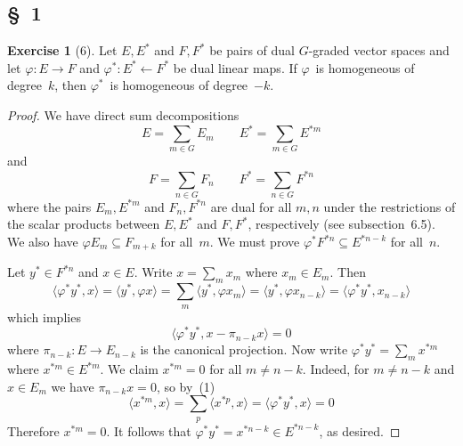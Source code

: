\documentclass[letterpaper,12pt]{article}
\newcommand{\from}{\leftarrow}
\newcommand{\sprod}[2]{\langle#1,#2\rangle}
\theoremstyle{definition}
\newtheorem*{exer}{Exercise}
\theoremstyle{remark}
\begin{document}
\subsection*{\S~1}
\begin{exer}[6]
Let \(E,E^*\) and \(F,F^*\) be pairs of dual \(G\)-graded vector spaces and let \(\varphi:E\to F\) and \(\varphi^*:E^*\from F^*\) be dual linear maps. If \(\varphi\)~is homogeneous of degree~\(k\), then \(\varphi^*\)~is homogeneous of degree~\(-k\).
\end{exer}
\begin{proof}
We have direct sum decompositions
\[E=\sum_{m\in G}E_m\qquad E^*=\sum_{m\in G}E^{*m}\]
and
\[F=\sum_{n\in G}F_n\qquad F^*=\sum_{n\in G}F^{*n}\]
where the pairs \(E_m,E^{*m}\) and \(F_n,F^{*n}\) are dual for all \(m,n\) under the restrictions of the scalar products between \(E,E^*\) and \(F,F^*\), respectively (see subsection~6.5). We also have \(\varphi E_m\subseteq F_{m+k}\) for all~\(m\). We must prove \(\varphi^* F^{*n}\subseteq E^{*n-k}\) for all~\(n\).

Let \(y^*\in F^{*n}\) and \(x\in E\). Write \(x=\sum_m x_m\) where \(x_m\in E_m\). Then
\[\sprod{\varphi^* y^*}{x}=\sprod{y^*}{\varphi x}=\sum_m\sprod{y^*}{\varphi x_m}=\sprod{y^*}{\varphi x_{n-k}}=\sprod{\varphi^* y^*}{x_{n-k}}\]
which implies
\[\sprod{\varphi^* y^*}{x-\pi_{n-k}x}=0\tag{1}\]
where \(\pi_{n-k}:E\to E_{n-k}\) is the canonical projection. Now write \(\varphi^* y^*=\sum_m x^{*m}\) where \(x^{*m}\in E^{*m}\). We claim \(x^{*m}=0\) for all \(m\ne n-k\). Indeed, for \(m\ne n-k\) and \(x\in E_m\) we have \(\pi_{n-k}x=0\), so by~(1)
\[\sprod{x^{*m}}{x}=\sum_p\sprod{x^{*p}}{x}=\sprod{\varphi^* y^*}{x}=0\]
Therefore \(x^{*m}=0\). It follows that \(\varphi^* y^*=x^{*n-k}\in E^{*n-k}\), as desired.
\end{proof}
\end{document}
